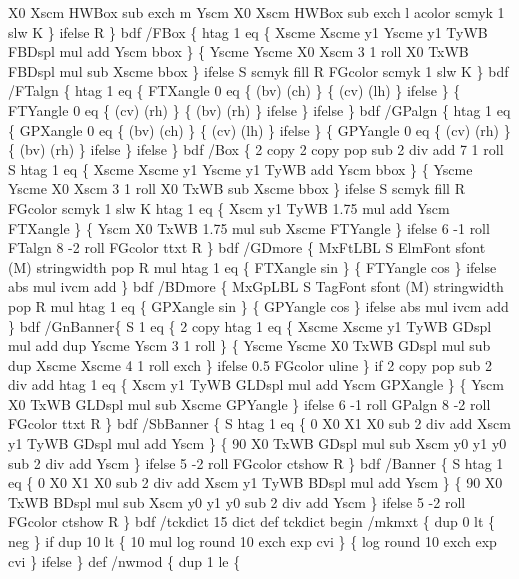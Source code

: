 \documentclass[11pt]{article}
\begin{document}
        X0 Xscm HWBox sub exch m Yscm X0 Xscm HWBox sub exch l
        acolor scmyk 1 slw K
      \} ifelse
  R \} bdf
/FBox \{
  htag 1 eq \{
    Xscme Xscme y1 Yscme y1 TyWB FBDspl mul add Yscm bbox
    \} \{
      Yscme Yscme X0 Xscm 3 1 roll X0 TxWB FBDspl mul sub Xscme bbox
    \} ifelse
  S scmyk fill R FGcolor scmyk 1 slw K
  \} bdf
/FTalgn \{
  htag 1 eq \{
    FTXangle 0 eq \{ (bv) (ch) \} \{ (cv) (lh) \} ifelse
    \} \{
      FTYangle 0 eq \{ (cv) (rh) \} \{ (bv) (rh) \} ifelse
    \} ifelse
  \} bdf
/GPalgn \{
  htag 1 eq \{
    GPXangle 0 eq \{ (bv) (ch) \} \{ (cv) (lh) \} ifelse
    \} \{
      GPYangle 0 eq \{ (cv) (rh) \} \{ (bv) (rh) \} ifelse
    \} ifelse
  \} bdf
/Box \{
  2 copy 2 copy pop sub 2 div add 7 1 roll
  S htag 1 eq \{
    Xscme Xscme y1 Yscme y1 TyWB add Yscm bbox
    \} \{
      Yscme Yscme X0 Xscm 3 1 roll X0 TxWB sub Xscme bbox
    \} ifelse
  S scmyk fill R
  FGcolor scmyk 1 slw K
  htag 1 eq \{
    Xscm y1 TyWB 1.75 mul add Yscm FTXangle
    \} \{
      Yscm X0 TxWB 1.75 mul sub Xscme FTYangle
    \} ifelse
  6 -1 roll FTalgn 8 -2 roll FGcolor ttxt
  R \} bdf
%
/GDmore \{
  MxFtLBL S ElmFont sfont (M) stringwidth pop R mul
  htag 1 eq \{ FTXangle sin \} \{ FTYangle cos \} ifelse
  abs mul ivcm add
  \} bdf
/BDmore \{
  MxGpLBL S TagFont sfont (M) stringwidth pop R mul
  htag 1 eq \{ GPXangle sin \} \{ GPYangle cos \} ifelse
  abs mul ivcm add
  \} bdf
%
/GnBanner\{
  S 1 eq \{
      2 copy
      htag 1 eq \{
        Xscme Xscme y1 TyWB GDspl mul add dup Yscme Yscm 3 1 roll
        \} \{
          Yscme Yscme X0 TxWB GDspl mul sub dup Xscme Xscme 4 1 roll exch
        \} ifelse
      0.5 FGcolor uline
      \} if
    2 copy pop sub 2 div add
    htag 1 eq \{
      Xscm y1 TyWB GLDspl mul add Yscm GPXangle
      \} \{
        Yscm X0 TxWB GLDspl mul sub Xscme GPYangle
      \} ifelse
    6 -1 roll GPalgn 8 -2 roll FGcolor ttxt
  R \} bdf
/SbBanner \{
  S htag 1 eq \{
      0 X0 X1 X0 sub 2 div add Xscm y1 TyWB GDspl mul add Yscm
      \} \{
        90 X0 TxWB GDspl mul sub Xscm y0 y1 y0 sub 2 div add Yscm
      \} ifelse
    5 -2 roll FGcolor ctshow
  R \} bdf
/Banner \{
  S htag 1 eq \{
      0 X0 X1 X0 sub 2 div add Xscm y1 TyWB BDspl mul add Yscm
      \} \{
        90 X0 TxWB BDspl mul sub Xscm y0 y1 y0 sub 2 div add Yscm
      \} ifelse
    5 -2 roll FGcolor ctshow
  R \} bdf
%
/tckdict 15 dict def
 tckdict begin
 /mkmxt \{
  dup 0 lt \{ neg \} if
  dup 10 lt \{
    10 mul log round 10 exch exp cvi
    \} \{
      log round 10 exch exp cvi
    \} ifelse
  \} def
 /nwmod \{
  dup 1 le \{
\end{document}
